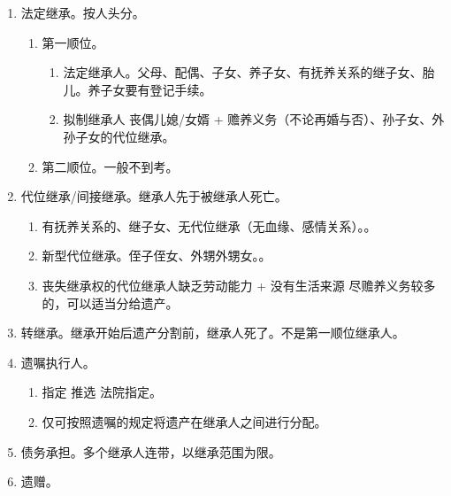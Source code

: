 \begin{enumerate}
\begin{enumerate}
\begin{enumerate}
                        。
                  \item 附义务的继承人必须履行。毕竟是遗愿嘛。
                \end{enumerate}
          \item 法定继承。按人头分。
                \begin{enumerate}
                  \item 第一顺位。
                        \begin{enumerate}
                          \item 法定继承人。父母、配偶、子女、养子女、有抚养关系的继子女、胎儿。养子女要有登记手续。
                          \item 拟制继承人 \yjt 丧偶儿媳/女婿 + 赡养义务（不论再婚与否）、孙子女、外孙子女的代位继承。
                        \end{enumerate}
                  \item 第二顺位。一般不到考。
                \end{enumerate}
          \item 代位继承/间接继承。继承人先于被继承人死亡。
                \begin{enumerate}
                  \item 有抚养关系的、继子女、无代位继承（无血缘、感情关系）。。
                  \item 新型代位继承。侄子侄女、外甥外甥女。。
                  \item 丧失继承权的代位继承人缺乏劳动能力 + 没有生活来源 \hz 尽赡养义务较多的，可以适当分给遗产。
                \end{enumerate}
          \item 转继承。继承开始后遗产分割前，继承人死了。不是第一顺位继承人。
          \item 遗嘱执行人。
                \begin{enumerate}
                  \item 指定 \yjt 推选 \yjt 法院指定。
                  \item 仅可按照遗嘱的规定将遗产在继承人之间进行分配。
                \end{enumerate}
          \item 债务承担。多个继承人连带，以继承范围为限。
          \item 遗赠。
                \begin{enumerate}

\end{enumerate}
\end{enumerate}
\end{enumerate}
